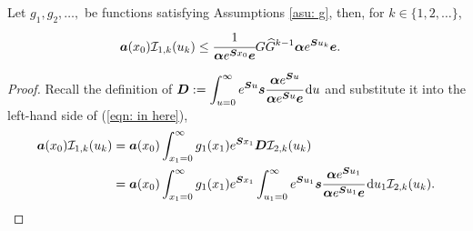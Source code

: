 \begin{lem}\label{lem: lh bnd}
	Let \(g_1, g_2, \dots,\) be functions satisfying Assumptions \ref{asu: g}, then, for \(k\in\{1,2,\dots\}\), 
	\begin{align}
		\boldsymbol a(x_0)\mathcal I_{1,k}(u_k) 
            	&\leq \cfrac{1}{\boldsymbol \alpha e^{\boldsymbol{S}x_0}\boldsymbol e}G\widehat G^{k-1} \boldsymbol \alpha e^{\boldsymbol{S}u_k}\boldsymbol e.\label{eqn: in here}
	\end{align}
\end{lem}
\begin{proof}
	Recall the definition of \(\boldsymbol{D}:=\displaystyle\int_{u=0}^\infty e^{\boldsymbol{S}u}\boldsymbol s \cfrac{\boldsymbol \alpha e^{\boldsymbol{S}u}}{\boldsymbol \alpha e^{\boldsymbol{S}u}\boldsymbol e}\, \mathrm{d} u\) and substitute it into the left-hand side of (\ref{eqn: in here}), 
	\begin{align*}
		\boldsymbol a(x_0) \mathcal I_{1,k}(u_k) &=\boldsymbol a(x_0) \int_{x_1=0}^\infty g_1(x_1) e^{\boldsymbol{S}x_1} \boldsymbol{D} \mathcal I_{2,k}(u_k)
		\\&=\boldsymbol a(x_0)\int_{x_1=0}^\infty g_1(x_1) e^{\boldsymbol{S}x_1} \int_{u_1=0}^\infty e^{\boldsymbol{S}u_1}\boldsymbol s \cfrac{\boldsymbol \alpha e^{\boldsymbol{S}u_1}}{\boldsymbol \alpha e^{\boldsymbol{S}u_1}\boldsymbol e}\, \mathrm{d} u_1 \mathcal I_{2,k}(u_k).
	\end{align*}
	

\end{proof}
